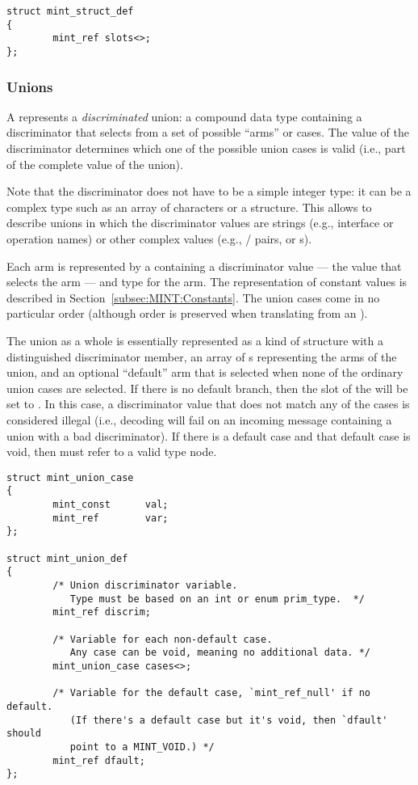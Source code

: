 \begin{verbatim}
struct mint_struct_def
{
        mint_ref slots<>;
};
\end{verbatim}


\subsubsection{Unions}

A  represents a \emph{discriminated} union: a compound data
type containing a discriminator that selects from a set of possible ``arms'' or
cases.  The value of the discriminator determines which one of the possible
union cases is valid (i.e., part of the complete value of the union).

Note that the discriminator does not have to be a simple integer type: it can
be a complex type such as an array of characters or a structure.  This allows
\MINT{} to describe unions in which the discriminator values are strings (e.g.,
interface or operation names) or other complex values (e.g., \ONCTCP{}
/ pairs, or \DCE{} s).

Each arm is represented by a  containing a discriminator
value --- the value that selects the arm --- and type for the
arm.  The \MINT{} representation of constant values is described in
Section~\ref{subsec:MINT:Constants}.  The union cases come in no particular
order (although order is preserved when translating from an ).

The union as a whole is essentially represented as a kind of structure with a
distinguished discriminator member, an array of s
representing the arms of the union, and an optional ``default'' arm that is
selected when none of the ordinary union cases are selected.  If there is no
default branch, then the  slot of the  will be
set to .  In this case, a discriminator value that does not
match any of the cases is considered illegal (i.e., decoding will fail on an
incoming message containing a union with a bad discriminator).  If there is a
default case and that default case is void, then  must refer to a
valid  type node.

\begin{verbatim}
struct mint_union_case
{
        mint_const      val;
        mint_ref        var;
};

struct mint_union_def
{
        /* Union discriminator variable.
           Type must be based on an int or enum prim_type.  */
        mint_ref discrim;

        /* Variable for each non-default case.
           Any case can be void, meaning no additional data. */
        mint_union_case cases<>;

        /* Variable for the default case, `mint_ref_null' if no default.
           (If there's a default case but it's void, then `dfault' should
           point to a MINT_VOID.) */
        mint_ref dfault;
};
\end{verbatim}

